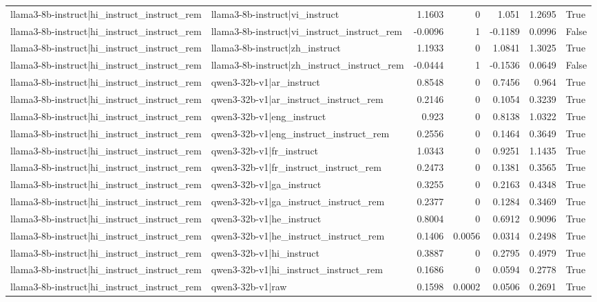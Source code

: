 \begin{table}
\begin{tabular}{l l r r r r l}
llama3-8b-instruct|hi_instruct_instruct_rem & llama3-8b-instruct|vi_instruct & 1.1603 & 0 & 1.051 & 1.2695 & True \\
llama3-8b-instruct|hi_instruct_instruct_rem & llama3-8b-instruct|vi_instruct_instruct_rem & -0.0096 & 1 & -0.1189 & 0.0996 & False \\
llama3-8b-instruct|hi_instruct_instruct_rem & llama3-8b-instruct|zh_instruct & 1.1933 & 0 & 1.0841 & 1.3025 & True \\
llama3-8b-instruct|hi_instruct_instruct_rem & llama3-8b-instruct|zh_instruct_instruct_rem & -0.0444 & 1 & -0.1536 & 0.0649 & False \\
llama3-8b-instruct|hi_instruct_instruct_rem & qwen3-32b-v1|ar_instruct & 0.8548 & 0 & 0.7456 & 0.964 & True \\
llama3-8b-instruct|hi_instruct_instruct_rem & qwen3-32b-v1|ar_instruct_instruct_rem & 0.2146 & 0 & 0.1054 & 0.3239 & True \\
llama3-8b-instruct|hi_instruct_instruct_rem & qwen3-32b-v1|eng_instruct & 0.923 & 0 & 0.8138 & 1.0322 & True \\
llama3-8b-instruct|hi_instruct_instruct_rem & qwen3-32b-v1|eng_instruct_instruct_rem & 0.2556 & 0 & 0.1464 & 0.3649 & True \\
llama3-8b-instruct|hi_instruct_instruct_rem & qwen3-32b-v1|fr_instruct & 1.0343 & 0 & 0.9251 & 1.1435 & True \\
llama3-8b-instruct|hi_instruct_instruct_rem & qwen3-32b-v1|fr_instruct_instruct_rem & 0.2473 & 0 & 0.1381 & 0.3565 & True \\
llama3-8b-instruct|hi_instruct_instruct_rem & qwen3-32b-v1|ga_instruct & 0.3255 & 0 & 0.2163 & 0.4348 & True \\
llama3-8b-instruct|hi_instruct_instruct_rem & qwen3-32b-v1|ga_instruct_instruct_rem & 0.2377 & 0 & 0.1284 & 0.3469 & True \\
llama3-8b-instruct|hi_instruct_instruct_rem & qwen3-32b-v1|he_instruct & 0.8004 & 0 & 0.6912 & 0.9096 & True \\
llama3-8b-instruct|hi_instruct_instruct_rem & qwen3-32b-v1|he_instruct_instruct_rem & 0.1406 & 0.0056 & 0.0314 & 0.2498 & True \\
llama3-8b-instruct|hi_instruct_instruct_rem & qwen3-32b-v1|hi_instruct & 0.3887 & 0 & 0.2795 & 0.4979 & True \\
llama3-8b-instruct|hi_instruct_instruct_rem & qwen3-32b-v1|hi_instruct_instruct_rem & 0.1686 & 0 & 0.0594 & 0.2778 & True \\
llama3-8b-instruct|hi_instruct_instruct_rem & qwen3-32b-v1|raw & 0.1598 & 0.0002 & 0.0506 & 0.2691 & True \\

\end{tabular}
\end{table}
